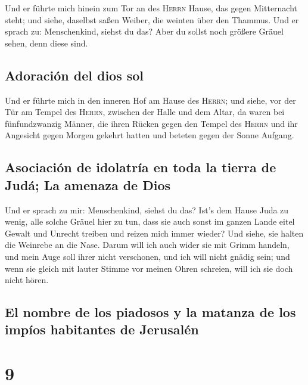  Und er führte mich hinein zum Tor an des \textsc{Herrn}
Hause, das gegen Mitternacht steht; und siehe, daselbst saßen Weiber,
die weinten über den Thammus.  Und er sprach zu:
Menschenkind, siehst du das? Aber du sollst noch größere Gräuel sehen,
denn diese sind.

\hypertarget{adoraciuxf3n-del-dios-sol}{%
\subsection{Adoración del dios sol}\label{adoraciuxf3n-del-dios-sol}}

 Und er führte mich in den inneren Hof am Hause des
\textsc{Herrn}; und siehe, vor der Tür am Tempel des \textsc{Herrn},
zwischen der Halle und dem Altar, da waren bei fünfundzwanzig Männer,
die ihren Rücken gegen den Tempel des \textsc{Herrn} und ihr Angesicht
gegen Morgen gekehrt hatten und beteten gegen der Sonne Aufgang.

\hypertarget{asociaciuxf3n-de-idolatruxeda-en-toda-la-tierra-de-juduxe1-la-amenaza-de-dios}{%
\subsection{Asociación de idolatría en toda la tierra de Judá; La
amenaza de
Dios}\label{asociaciuxf3n-de-idolatruxeda-en-toda-la-tierra-de-juduxe1-la-amenaza-de-dios}}

 Und er sprach zu mir: Menschenkind, siehst du das? Ist's
dem Hause Juda zu wenig, alle solche Gräuel hier zu tun, dass sie auch
sonst im ganzen Lande eitel Gewalt und Unrecht treiben und reizen mich
immer wieder? Und siehe, sie halten die Weinrebe an die Nase.
 Darum will ich auch wider sie mit Grimm handeln, und
mein Auge soll ihrer nicht verschonen, und ich will nicht gnädig sein;
und wenn sie gleich mit lauter Stimme vor meinen Ohren schreien, will
ich sie doch nicht hören.

\hypertarget{el-nombre-de-los-piadosos-y-la-matanza-de-los-impuxedos-habitantes-de-jerusaluxe9n}{%
\subsection{El nombre de los piadosos y la matanza de los impíos
habitantes de
Jerusalén}\label{el-nombre-de-los-piadosos-y-la-matanza-de-los-impuxedos-habitantes-de-jerusaluxe9n}}

\hypertarget{section-8}{%
\section{9}\label{section-8}}

